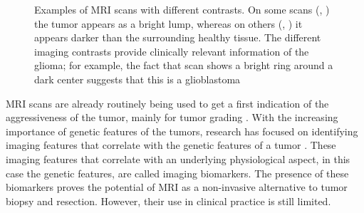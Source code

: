 \begin{figure}[hbt]
    \caption{Examples of \acrshort{MRI} scans with different contrasts. On some scans (\textbf{\protect{}}, \textbf{\protect{}}) the \gls{tumor} appears as a bright lump, whereas on others (\textbf{\protect{}}, \textbf{\protect{}}) it appears darker than the surrounding healthy tissue. The different imaging contrasts provide clinically relevant information of the glioma; for example, the fact that scan \textbf{\protect{}} shows a bright ring around a dark center suggests that this is a glioblastoma}\label{fig:intro_MR_example}
\end{figure}

\gls{MRI} scans are already routinely being used to get a first indication of the aggressiveness of the \gls{tumor}, mainly for \gls{tumor} grading \autocite{upadhyay2011MRIevaluation}.
With the increasing importance of genetic features of the \glspl{tumor}, research has focused on identifying imaging features that correlate with the genetic features of a \gls{tumor} \autocite{patel2017mismatch, smits2016imaging}.
These imaging features that correlate with an underlying physiological aspect, in this case the genetic features, are called imaging biomarkers.
The presence of these biomarkers proves the potential of \gls{MRI} as a non-invasive alternative to \gls{tumor} biopsy and resection.
However, their use in clinical practice is still limited.

